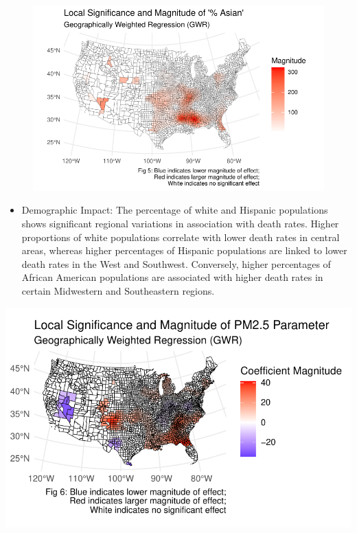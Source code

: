 \documentclass[
]{article}
\providecommand{\tightlist}{%
  \setlength{\itemsep}{0pt}\setlength{\parskip}{0pt}}\usepackage{longtable,booktabs,array}
\begin{document}
\begin{figure}
%
\begin{minipage}{0.50\linewidth}
\includegraphics{report_files/figure-pdf/unnamed-chunk-3-4.pdf}\end{minipage}%

\end{figure}%

\begin{itemize}
\tightlist
\item
  Demographic Impact: The percentage of white and Hispanic populations
  shows significant regional variations in association with death rates.
  Higher proportions of white populations correlate with lower death
  rates in central areas, whereas higher percentages of Hispanic
  populations are linked to lower death rates in the West and Southwest.
  Conversely, higher percentages of African American populations are
  associated with higher death rates in certain Midwestern and
  Southeastern regions.
\end{itemize}

\includegraphics{report_files/figure-pdf/unnamed-chunk-4-1.pdf}
\end{document}
